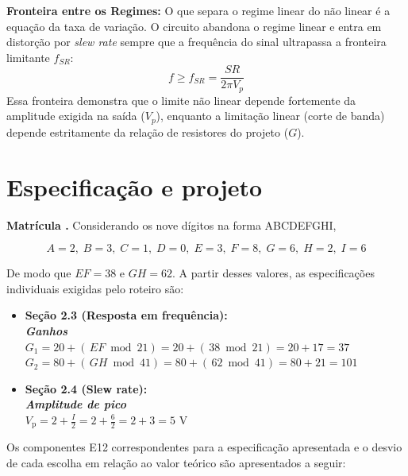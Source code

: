 \documentclass[11pt,a4paper]{article}
\begin{document}
\textbf{Fronteira entre os Regimes:}
O que separa o regime linear do não linear é a equação da taxa de variação. O circuito abandona o regime linear e entra em distorção por \textit{slew rate} sempre que a frequência do sinal ultrapassa a fronteira limitante $f_{SR}$:
\begin{equation}
f \ge f_{SR} = \frac{SR}{2\pi V_p}
\label{eq:fsr}
\end{equation}
Essa fronteira demonstra que o limite não linear depende fortemente da amplitude exigida na saída ($V_p$), enquanto a limitação linear (corte de banda) depende estritamente da relação de resistores do projeto ($G$).
\section{Especificação e projeto}

\begin{espec}

\textbf{Matrícula .} Considerando os nove dígitos na forma ABCDEFGHI,

\begin{equation}
    A=2,\; B=3,\; C=1,\; D=0,\; E=3,\; F=8,\; G=6,\; H=2,\; I=6
\end{equation}

De modo que $EF=38$ e $GH=62$. A partir desses valores, as especificações individuais exigidas pelo roteiro são:

\begin{itemize}
    \item \textbf{Seção 2.3 (Resposta em frequência):} \\
    \textbf{\textit{Ganhos}} \\
    $G_1=20+(\,EF\bmod 21)=20+(\,38\bmod 21)=20+17=37$ \\
    $G_2=80+(\,GH\bmod 41)=80+(\,62\bmod 41)=80+21=101$

    \vspace{0.3cm}
    
    \item \textbf{Seção 2.4 (Slew rate):} \\
    \textbf{\textit{Amplitude de pico}} \\
    $V_{\text{p}}=2+\frac{I}{2}=2+\frac{6}{2}=2+3=5\text{ V}$
\end{itemize}

\end{espec}

Os componentes E12 correspondentes para a especificação apresentada e o desvio de cada escolha em relação ao valor teórico são apresentados a seguir:
\end{document}
